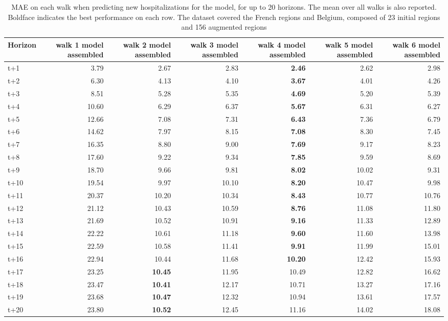 \begin{table}[H]
\centering
\caption{MAE on each walk when predicting new hospitalizations for the model, for up to 20 horizons. The mean over all walks is also reported. Boldface indicates the best performance on each row. The dataset covered the French regions and Belgium, composed of 23 initial regions and 156 augmented regions }
\label{tab:MAE_walk_assembly}
\begin{tabular}{lrrrrrr}
\toprule
Horizon &  walk 1 model assembled &  walk 2 model assembled &  walk 3 model assembled &  walk 4 model assembled &  walk 5 model assembled &  walk 6 model assembled \\
\midrule
t+1  & 3.79  & 2.67  & 2.83  & \textbf{2.46}  & 2.62  & 2.98  \\
t+2  & 6.30  & 4.13  & 4.10  & \textbf{3.67}  & 4.01  & 4.26  \\
t+3  & 8.51  & 5.28  & 5.35  & \textbf{4.69}  & 5.20  & 5.39  \\
t+4  & 10.60  & 6.29  & 6.37  & \textbf{5.67}  & 6.31  & 6.27  \\
t+5  & 12.66  & 7.08  & 7.31  & \textbf{6.43}  & 7.36  & 6.79  \\
t+6  & 14.62  & 7.97  & 8.15  & \textbf{7.08}  & 8.30  & 7.45  \\
t+7  & 16.35  & 8.80  & 9.00  & \textbf{7.69}  & 9.17  & 8.23  \\
t+8  & 17.60  & 9.22  & 9.34  & \textbf{7.85}  & 9.59  & 8.69  \\
t+9  & 18.70  & 9.66  & 9.81  & \textbf{8.02}  & 10.02  & 9.31  \\
t+10  & 19.54  & 9.97  & 10.10  & \textbf{8.20}  & 10.47  & 9.98  \\
t+11  & 20.37  & 10.20  & 10.34  & \textbf{8.43}  & 10.77  & 10.76  \\
t+12  & 21.12  & 10.43  & 10.59  & \textbf{8.76}  & 11.08  & 11.80  \\
t+13  & 21.69  & 10.52  & 10.91  & \textbf{9.16}  & 11.33  & 12.89  \\
t+14  & 22.22  & 10.61  & 11.18  & \textbf{9.60}  & 11.60  & 13.98  \\
t+15  & 22.59  & 10.58  & 11.41  & \textbf{9.91}  & 11.99  & 15.01  \\
t+16  & 22.94  & 10.44  & 11.68  & \textbf{10.20}  & 12.42  & 15.93  \\
t+17  & 23.25  & \textbf{10.45}  & 11.95  & 10.49  & 12.82  & 16.62  \\
t+18  & 23.47  & \textbf{10.41}  & 12.17  & 10.71  & 13.27  & 17.16  \\
t+19  & 23.68  & \textbf{10.47}  & 12.32  & 10.94  & 13.61  & 17.57  \\
t+20  & 23.80  & \textbf{10.52}  & 12.45  & 11.16  & 14.02  & 18.08  \\

\bottomrule
\end{tabular}
\end{table}
